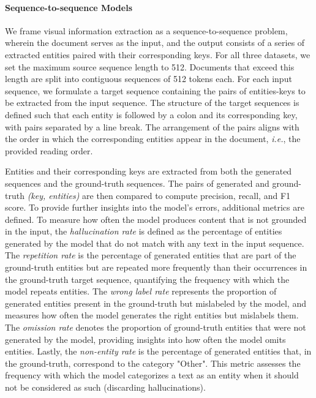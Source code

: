 \paragraph{Sequence-to-sequence Models} 

We frame visual information extraction as a sequence-to-sequence problem, wherein the document serves as the input, and the output consists of a series of extracted entities paired with their corresponding keys. For all three datasets, we set the maximum source sequence length to 512. Documents that exceed this length are split into contiguous sequences of 512 tokens each. For each input sequence, we formulate a target sequence containing the pairs of entities-keys to be extracted from the input sequence. The structure of the target sequences is defined such that each entity is followed by a colon and its corresponding key, with pairs separated by a line break. The arrangement of the pairs aligns with the order in which the corresponding entities appear in the document, \textit{i.e.}, the provided reading order.

Entities and their corresponding keys are extracted from both the generated sequences and the ground-truth sequences. The pairs of generated and ground-truth \textit{(key, entities)} are then compared to compute precision, recall, and F1 score. To provide further insights into the model's errors, additional metrics are defined. To measure how often the model produces content that is not grounded in the input, the \textit{hallucination rate} is defined as the percentage of entities generated by the model that do not match with any text in the input sequence. The \textit{repetition rate} is the percentage of generated entities that are part of the ground-truth entities but are repeated more frequently than their occurrences in the ground-truth target sequence, quantifying the frequency with which the model repeats entities. The \textit{wrong label rate} represents the proportion of generated entities present in the ground-truth but mislabeled by the model, and measures how often the model generates the right entities but mislabels them. The \textit{omission rate} denotes the proportion of ground-truth entities that were not generated by the model, providing insights into how often the model omits entities. Lastly, the \textit{non-entity rate} is the percentage of generated entities that, in the ground-truth, correspond to the category "Other". This metric assesses the frequency with which the model categorizes a text as an entity when it should not be considered as such (discarding hallucinations).

